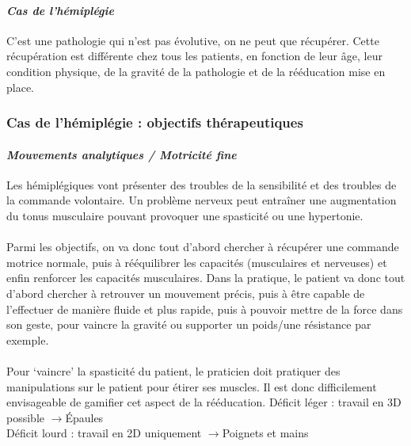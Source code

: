	\paragraph{\emph{Cas de l’hémiplégie} \\}
C’est une pathologie qui n’est pas évolutive, on ne peut que récupérer. Cette récupération est différente chez tous les patients, en fonction de leur âge, leur condition physique, de la gravité de la pathologie et de la rééducation mise en place.

	\subsubsection*{Cas de l'hémiplégie : objectifs thérapeutiques}
\paragraph{\emph{Mouvements analytiques / Motricité fine} \\ }
Les hémiplégiques vont présenter des troubles de la sensibilité et des troubles de la commande volontaire. Un problème nerveux peut entraîner une augmentation du tonus musculaire pouvant provoquer une spasticité ou une hypertonie. 

\paragraph{}
Parmi les objectifs, on va donc tout d’abord chercher à récupérer une commande motrice normale, puis à rééquilibrer les capacités (musculaires et nerveuses) et enfin renforcer les capacités musculaires. Dans la pratique, le patient va donc tout d’abord chercher à retrouver un mouvement précis, puis à être capable de l’effectuer de manière fluide et plus rapide, puis à pouvoir mettre de la force dans son geste, pour vaincre la gravité ou supporter un poids/une résistance par exemple.

\paragraph{}
Pour ‘vaincre’ la spasticité du patient, le praticien doit pratiquer des manipulations sur le patient pour étirer ses muscles. Il est donc difficilement envisageable de gamifier cet aspect de la rééducation.\newline
Déficit léger : travail en 3D possible     \quad$ \rightarrow $\quad       Épaules\\
Déficit lourd : travail en 2D uniquement  \quad $\rightarrow $\quad      Poignets et mains

